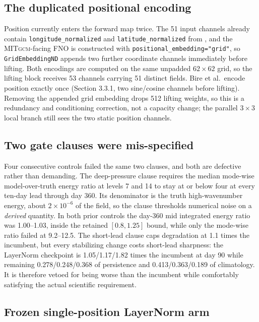 \documentclass[11pt]{article}
\newcommand{\MITgcm}{\textsc{MITgcm}}
\begin{document}
\subsection{The duplicated positional encoding}

Position currently enters the forward map twice.  The 51 input channels already contain
\texttt{longitude\_normalized} and \texttt{latitude\_normalized} from
, and the \MITgcm{}-facing FNO is constructed with
\texttt{positional\_embedding="grid"}, so \texttt{GridEmbeddingND} appends two further
coordinate channels immediately before lifting.  Both encodings are computed on the same
unpadded \(62\times62\) grid, so the lifting block receives 53 channels carrying 51
distinct fields.  Bire et al.\ encode position exactly once (Section 3.3.1, two
sine/cosine channels before lifting).  Removing the appended grid embedding drops 512
lifting weights, so this is a redundancy and conditioning correction, not a capacity
change; the parallel \(3\times3\) local branch still sees the two static position
channels.

\subsection{Two gate clauses were mis-specified}

Four consecutive controls failed the same two clauses, and both are defective rather than
demanding.  The deep-pressure clause requires the median mode-wise model-over-truth energy
ratio at levels 7 and 14 to stay at or below four at every ten-day lead through day 360.
Its denominator is the truth high-wavenumber energy, about \(2\times10^{-6}\) of the
field, so the clause thresholds numerical noise on a \emph{derived} quantity.  In both
prior controls the day-360 mid integrated energy ratio was 1.00--1.03, inside the retained
\([0.8,1.25]\) bound, while only the mode-wise ratio failed at 9.2--12.5.  The
short-lead clause caps degradation at 1.1 times the incumbent, but every stabilizing
change costs short-lead sharpness: the LayerNorm checkpoint is 1.05/1.17/1.82 times the
incumbent at day 90 while remaining 0.278/0.248/0.368 of persistence and
0.413/0.363/0.189 of climatology.  It is therefore vetoed for being worse than the
incumbent while comfortably satisfying the actual scientific requirement.

\subsection{Frozen single-position LayerNorm arm}
\end{document}
